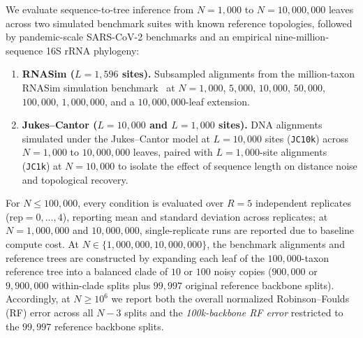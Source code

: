 \documentclass[11pt,a4paper]{article}
\makeatletter
\DeclareRobustCommand{\_}{\ifmmode\nfss@text{\textunderscore}\else\textunderscore\allowbreak\fi}
\theoremstyle{definition}
\makeatother
\begin{document}
We evaluate sequence-to-tree inference from $N=1{,}000$ to $N=10{,}000{,}000$ leaves across two simulated benchmark suites with known reference topologies, followed by pandemic-scale SARS-CoV-2 benchmarks and an empirical nine-million-sequence 16S rRNA phylogeny:
\begin{enumerate}
 \item \textbf{RNASim ($L=1{,}596$ sites).} Subsampled alignments from the million-taxon RNASim simulation benchmark~\cite{mirarab2015pasta} at $N=1{,}000$, $5{,}000$, $10{,}000$, $50{,}000$, $100{,}000$, $1{,}000{,}000$, and a $10{,}000{,}000$-leaf extension.
 \item \textbf{Jukes--Cantor ($L=10{,}000$ and $L=1{,}000$ sites).} DNA alignments simulated under the Jukes--Cantor model at $L=10{,}000$ sites (\texttt{JC10k}) across $N=1{,}000$ to $10{,}000{,}000$ leaves, paired with $L=1{,}000$-site alignments (\texttt{JC1k}) at $N=10{,}000$ to isolate the effect of sequence length on distance noise and topological recovery.
\end{enumerate}

For $N\leq100{,}000$, every condition is evaluated over $R=5$ independent replicates ($\text{rep}=0,\ldots,4$), reporting mean and standard deviation across replicates; at $N=1{,}000{,}000$ and $10{,}000{,}000$, single-replicate runs are reported due to baseline compute cost.
At $N\in\{1{,}000{,}000,10{,}000{,}000\}$, the benchmark alignments and reference trees are constructed by expanding each leaf of the $100{,}000$-taxon reference tree into a balanced clade of $10$ or $100$ noisy copies ($900{,}000$ or $9{,}900{,}000$ within-clade splits plus $99{,}997$ original reference backbone splits).
Accordingly, at $N\ge 10^6$ we report both the overall normalized Robinson--Foulds (RF) error across all $N-3$ splits and the \emph{100k-backbone RF error} restricted to the $99{,}997$ reference backbone splits.
\end{document}
